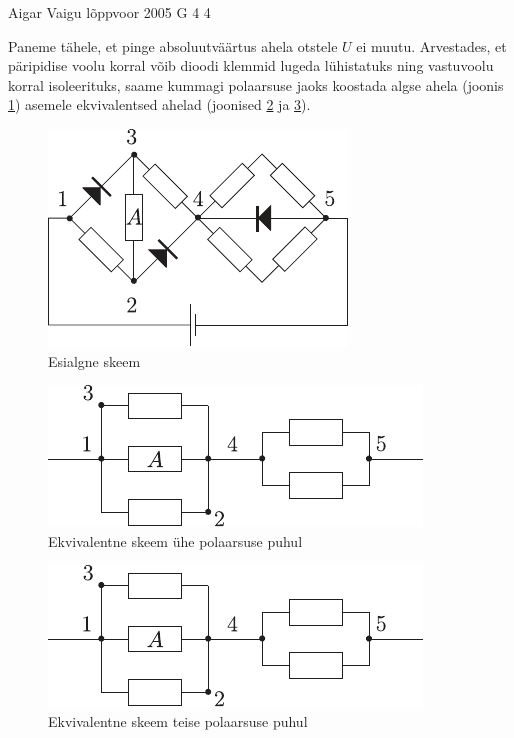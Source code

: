 \documentclass[11pt, twoside]{article}
\begin{document}
{%
{Aigar Vaigu} %
{lõppvoor} %
{2005} %
{G 4} %
{4} %
{

\ifSolution
Paneme tähele, et pinge absoluutväärtus ahela otstele $U$ ei muutu. Arvestades, et päripidise voolu korral võib dioodi klemmid lugeda lühistatuks ning vastuvoolu korral isoleerituks, saame kummagi polaarsuse jaoks koostada algse ahela (joonis \ref{2005-v3g-04:fig1}) asemele ekvivalentsed ahelad (joonised \ref{2005-v3g-04:fig2} ja \ref{2005-v3g-04:fig3}).

\begin{figure}[h]
	\centering
	\includegraphics[width=0.6\linewidth]{2005-v3g-04-lah1}
	\caption{Esialgne skeem}
	\label{2005-v3g-04:fig1}
\end{figure}
\begin{figure}[h]
	\centering
	\includegraphics[width=0.6\linewidth]{2005-v3g-04-lah2}
	\caption{Ekvivalentne skeem ühe polaarsuse puhul}
	\label{2005-v3g-04:fig2}
\end{figure}
\begin{figure}[h]
	\centering
	\includegraphics[width=0.6\linewidth]{2005-v3g-04-lah2}
	\caption{ Ekvivalentne skeem teise polaarsuse puhul}
	\label{2005-v3g-04:fig3}
\end{figure}

}}
\end{document}
